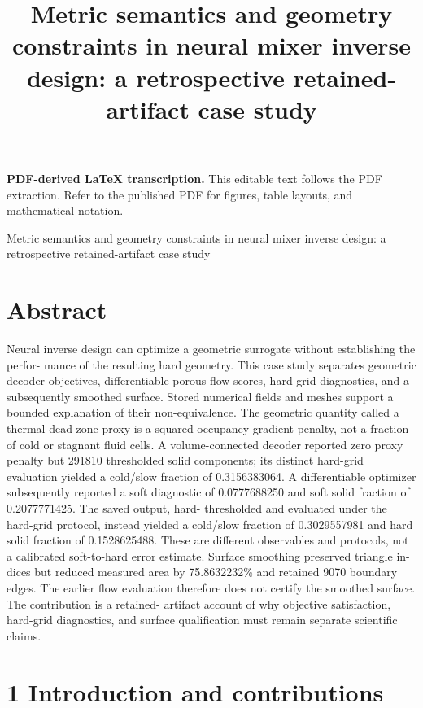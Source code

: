 \documentclass[11pt]{article}
\title{Metric semantics and geometry constraints in neural mixer inverse design: a retrospective retained-artifact case study}
\author{}
\date{}
\begin{document}
\maketitle
\noindent\textbf{PDF-derived LaTeX transcription.} This editable text follows the PDF extraction. Refer to the published PDF for figures, table layouts, and mathematical notation.


Metric semantics and geometry constraints in neural mixer inverse
design: a retrospective retained-artifact case study

\section*{Abstract}

Neural inverse design can optimize a geometric surrogate without establishing the perfor-
mance of the resulting hard geometry. This case study separates geometric decoder objectives,
differentiable porous-flow scores, hard-grid diagnostics, and a subsequently smoothed surface.
Stored numerical fields and meshes support a bounded explanation of their non-equivalence. The
geometric quantity called a thermal-dead-zone proxy is a squared occupancy-gradient penalty,
not a fraction of cold or stagnant fluid cells. A volume-connected decoder reported zero proxy
penalty but 291810 thresholded solid components; its distinct hard-grid evaluation yielded a
cold/slow fraction of 0.3156383064. A differentiable optimizer subsequently reported a soft
diagnostic of 0.0777688250 and soft solid fraction of 0.2077771425. The saved output, hard-
thresholded and evaluated under the hard-grid protocol, instead yielded a cold/slow fraction
of 0.3029557981 and hard solid fraction of 0.1528625488. These are different observables and
protocols, not a calibrated soft-to-hard error estimate. Surface smoothing preserved triangle in-
dices but reduced measured area by 75.8632232\% and retained 9070 boundary edges. The earlier
flow evaluation therefore does not certify the smoothed surface. The contribution is a retained-
artifact account of why objective satisfaction, hard-grid diagnostics, and surface qualification
must remain separate scientific claims.

\section*{1 Introduction and contributions}
\end{document}
